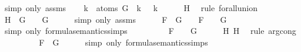 \begin{isabellebody}
\ {\isacharparenleft}simp\ only{\isacharcolon}\ assms{\isacharparenleft}{}{\isacharparenright}{\isacharparenright}\isanewline
\ \ \isamarkupfalse%
\ {\isachardoublequoteopen}{\isasymforall}k\ {\isasymin}\ atoms\ G{\isachardot}\ {\isasymA}\ k\ {\isacharequal}\ {\isasymA}\ k{\isachardoublequoteclose}\isanewline
\ \ \ \ \isamarkupfalse%
\ H\ \isamarkupfalse%
\ {\isacharparenleft}rule\ forall{\isacharunderscore}union{}{\isacharparenright}\isanewline
\ \ \isamarkupfalse%
\ \isamarkupfalse%
\ H{}{\isacharcolon}{\isachardoublequoteopen}{\isasymA}\ {\isasymTurnstile}\ G\ {\isasymlongleftrightarrow}\ {\isasymA}\ {\isasymTurnstile}\ G{\isachardoublequoteclose}\isanewline
\ \ \ \ \isamarkupfalse%
\ {\isacharparenleft}simp\ only{\isacharcolon}\ assms{\isacharparenleft}{}{\isacharparenright}{\isacharparenright}\isanewline
\ \ \isamarkupfalse%
\ {\isachardoublequoteopen}{\isasymA}\ {\isasymTurnstile}\ F\ \isactrlbold {\isasymrightarrow}\ G\ {\isacharequal}\ {\isacharparenleft}{\isasymA}\ {\isasymTurnstile}\ F\ {\isasymlongrightarrow}\ {\isasymA}\ {\isasymTurnstile}\ G{\isacharparenright}{\isachardoublequoteclose}\isanewline
\ \ \ \ \isamarkupfalse%
\ {\isacharparenleft}simp\ only{\isacharcolon}\ formula{\isacharunderscore}semantics{\isachardot}simps{\isacharparenleft}{}{\isacharparenright}{\isacharparenright}\isanewline
\ \ \isamarkupfalse%
\ \isamarkupfalse%
\ {\isachardoublequoteopen}{\isasymdots}\ {\isacharequal}\ {\isacharparenleft}{\isasymA}\ {\isasymTurnstile}\ F\ {\isasymlongrightarrow}\ {\isasymA}\ {\isasymTurnstile}\ G{\isacharparenright}{\isachardoublequoteclose}\isanewline
\ \ \ \ \isamarkupfalse%
\ H{}\ H{}\ \isamarkupfalse%
\ {\isacharparenleft}rule\ arg{\isacharunderscore}cong{}{\isacharparenright}\isanewline
\ \ \isamarkupfalse%
\ \isamarkupfalse%
\ {\isachardoublequoteopen}{\isasymdots}\ {\isacharequal}\ {\isasymA}\ {\isasymTurnstile}\ F\ \isactrlbold {\isasymrightarrow}\ G{\isachardoublequoteclose}\isanewline
\ \ \ \ \isamarkupfalse%
\ {\isacharparenleft}simp\ only{\isacharcolon}\ formula{\isacharunderscore}semantics{\isachardot}simps{\isacharparenleft}{}{\isacharparenright}{\isacharparenright}\isanewline

\end{isabellebody}
